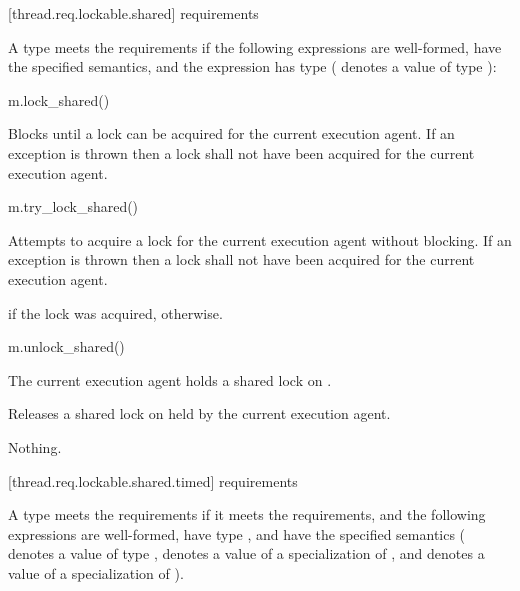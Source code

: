 [thread.req.lockable.shared]{ requirements}

\pnum
A type  meets the  requirements if
the following expressions are well-formed, have the specified semantics, and
the expression  has type 
( denotes a value of type ):

\begin{itemdecl}
m.lock_shared()
\end{itemdecl}

\begin{itemdescr}
\pnum
\effects
Blocks until a lock can be acquired for the current execution agent.
If an exception is thrown then a lock shall not have been acquired for
the current execution agent.
\end{itemdescr}

\begin{itemdecl}
m.try_lock_shared()
\end{itemdecl}

\begin{itemdescr}
\pnum
\effects
Attempts to acquire a lock for the current execution agent without blocking.
If an exception is thrown then a lock shall not have been acquired for
the current execution agent.

\pnum
\returns
{} if the lock was acquired,  otherwise.
\end{itemdescr}

\begin{itemdecl}
m.unlock_shared()
\end{itemdecl}

\begin{itemdescr}
\pnum
\expects
The current execution agent holds a shared lock on .

\pnum
\effects
Releases a shared lock on  held by the current execution agent.

\pnum
\throws
Nothing.
\end{itemdescr}

[thread.req.lockable.shared.timed]{ requirements}

\pnum
A type  meets the  requirements if
it meets the  requirements, and
the following expressions are well-formed, have type , and
have the specified semantics
( denotes a value of type ,
 denotes a value of a specialization of , and
 denotes a value of a specialization of ).

